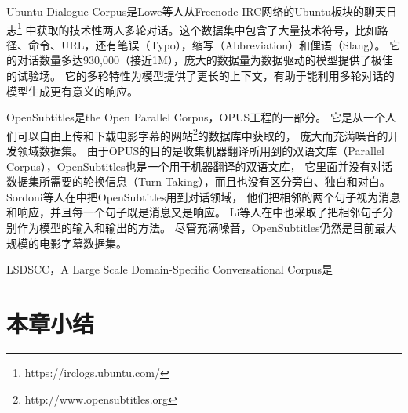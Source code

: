 Ubuntu Dialogue Corpus是Lowe等人从Freenode IRC网络的Ubuntu板块的聊天日志\footnote{https://irclogs.ubuntu.com/}
中获取的技术性两人多轮对话。这个数据集中包含了大量技术符号，比如路径、命令、URL，还有笔误（Typo），缩写（Abbreviation）和俚语（Slang）。
它的对话数量多达930,000（接近1M），庞大的数据量为数据驱动的模型提供了极佳的试验场。
它的多轮特性为模型提供了更长的上下文，有助于能利用多轮对话的模型生成更有意义的响应。

OpenSubtitles是the Open Parallel Corpus，OPUS工程的一部分。
它是从一个人们可以自由上传和下载电影字幕的网站\footnote{http://www.opensubtitles.org}的数据库中获取的，
庞大而充满噪音的开发领域数据集。
由于OPUS的目的是收集机器翻译所用到的双语文库（Parallel Corpus），OpenSubtitles也是一个用于机器翻译的双语文库，
它里面并没有对话数据集所需要的轮换信息（Turn-Taking），而且也没有区分旁白、独白和对白。
Sordoni等人在\cite{GoogleChatbot}中把OpenSubtitles用到对话领域，
他们把相邻的两个句子视为消息和响应，并且每一个句子既是消息又是响应。
Li等人在\cite{MMI}中也采取了把相邻句子分别作为模型的输入和输出的方法。
尽管充满噪音，OpenSubtitles仍然是目前最大规模的电影字幕数据集。

LSDSCC，A Large Scale Domain-Specific Conversational Corpus是

\section{本章小结}\label{sec:rw_conclusion}

